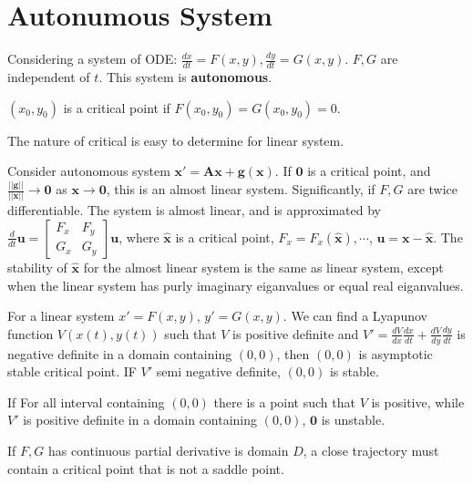 \documentclass[12pt]{article}
\begin{document}
\section{Autonumous System}
Considering a system of ODE: $\frac{dx}{dt} = F(x,y), \frac{dy}{dt} = G(x,y)$. $F, G$ are independent of $t$. This system is \textbf{autonomous}.

\begin{definition}
	$(x_0, y_0)$ is a critical point if $F(x_0, y_0) = G(x_0, y_0) = 0$.
\end{definition}

The nature of critical is easy to determine for linear system. 

\begin{definition}
	Consider autonomous system $\bm{x}' = \bm{A}\bm{x} + \bm{g}(\bm{x})$.  
	If $\bm{0}$ is a critical point, and $\frac{||\bm{g}||}{||\bm{x}||} \rightarrow \bm{0}$ as $\bm{x} \rightarrow \bm{0}$, this is an almost linear system.
	Significantly, if $F, G$ are twice differentiable. The system is almost linear, and is approximated by
	$\frac{d}{dt} \bm{u} = \begin{bmatrix} F_x & F_y \\ G_x & G_y \end{bmatrix} \bm{u} $, where $\hat{\bm{x}}$ is a critical point, $F_x = F_x(\hat{\bm{x}}), \cdots$, $\bm{u} = \bm{x} - \hat{\bm{x}}$.
	The stability of $\hat{\bm{x}}$ for the almost linear system is the same as linear system, except when the linear system has purly imaginary eiganvalues or equal real eiganvalues.
\end{definition}

\begin{theorem}[Lyapunov]
	For a linear system $x' = F(x,y)$, $y' = G(x,y)$. We can find a Lyapunov function $V(x(t), y(t))$ such that $V$ is positive definite and $V' = \frac{dV}{dx}\frac{dx}{dt} + \frac{dV}{dy} \frac{dy}{dt} $ is negative definite in a domain containing $(0,0)$, then $(0,0)$ is asymptotic stable critical point. IF $V'$ semi negative definite, $(0,0)$ is stable. 

	If For all interval containing $(0,0)$ there is a point such that $V$ is positive, while $V'$ is positive definite in a domain containing $(0,0)$, $\bm{0}$ is unstable.
\end{theorem}

\begin{theorem}
If $F,G$ has continuous partial derivative is domain $D$, a close trajectory must contain a critical point that is not a saddle point.
\end{theorem}
\end{document}

